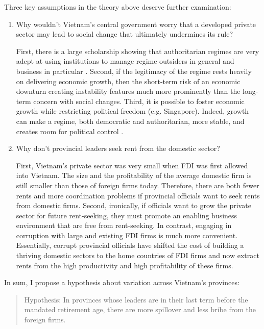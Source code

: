 Three key assumptions in the theory above deserve further examination:
\begin{enumerate}
\item Why wouldn't Vietnam's central government worry that a developed private sector may lead to social change that ultimately undermines its rule?

First, there is a large scholarship showing that authoritarian regimes are very adept at using institutions to manage regime outsiders in general and business in particular \citep{Gandhi2006, Gandhi2008, Wright2008, Le2015}. Second, if the legitimacy of the regime rests heavily on delivering economic growth, then the short-term risk of an economic downturn creating instability features much more prominently than the long-term concern with social changes. Third, it is possible to foster economic growth while restricting political freedom (e.g. Singapore). Indeed, growth can make a regime, both democratic and authoritarian, more stable, and creates room for political control \citep{Przeworski1997}.

\item Why don't provincial leaders seek rent from the domestic sector? 

First, Vietnam's private sector was very small when FDI was first allowed into Vietnam. The size and the profitability of the average domestic firm is still smaller than those of foreign firms today. Therefore, there are both fewer rents and more coordination problems if provincial officials want to seek rents from domestic firms. Second, ironically, if officials want to grow the private sector for future rent-seeking, they must promote an enabling business environment that are free from rent-seeking. In contrast, engaging in corruption with large and existing FDI firms is much more convenient. Essentially, corrupt provincial officials have shifted the cost of building a thriving domestic sectors to the home countries of FDI firms and now extract rents from the high productivity and high profitability of these firms. 
\end{enumerate}

In sum, I propose a hypothesis about variation across Vietnam's provinces:

\begin{quote}
Hypothesis: In provinces whose leaders are in their last term before the mandated retirement age, there are more spillover and less bribe from the foreign firms.
\end{quote}
